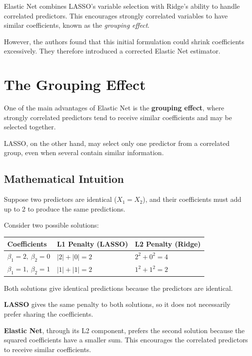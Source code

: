\documentclass[
  letterpaper,
  DIV=11,
  numbers=noendperiod]{scrreprt}
\newcounter{none} %
\begin{document}
Elastic Net combines LASSO's variable selection with Ridge's ability to
handle correlated predictors. This encourages strongly correlated
variables to have similar coefficients, known as the \emph{grouping
effect}.

However, the authors found that this initial formulation could shrink
coefficients excessively. They therefore introduced a corrected Elastic
Net estimator.

\section{The Grouping Effect}\label{the-grouping-effect}

One of the main advantages of Elastic Net is the \textbf{grouping
effect}, where strongly correlated predictors tend to receive similar
coefficients and may be selected together.

LASSO, on the other hand, may select only one predictor from a
correlated group, even when several contain similar information.

\subsection{Mathematical Intuition}\label{mathematical-intuition}

Suppose two predictors are identical (\(X_1 = X_2\)), and their
coefficients must add up to 2 to produce the same predictions.

Consider two possible solutions:

{\def\LTcaptype{none} %
\begin{longtable}[]{@{}lll@{}}
\toprule\noalign{}
Coefficients & L1 Penalty (LASSO) & L2 Penalty (Ridge) \\
\midrule\noalign{}
\endhead
\bottomrule\noalign{}
\endlastfoot
\(\beta_1=2,\ \beta_2=0\) & \(|2|+|0|=2\) & \(2^2+0^2=4\) \\
\(\beta_1=1,\ \beta_2=1\) & \(|1|+|1|=2\) & \(1^2+1^2=2\) \\
\end{longtable}
}

Both solutions give identical predictions because the predictors are
identical.

\textbf{LASSO} gives the same penalty to both solutions, so it does not
necessarily prefer sharing the coefficients.

\textbf{Elastic Net}, through its L2 component, prefers the second
solution because the squared coefficients have a smaller sum. This
encourages the correlated predictors to receive similar coefficients.
\end{document}
